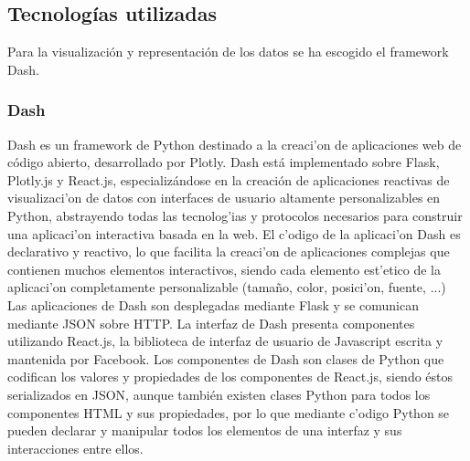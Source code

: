 \subsection{Tecnologías utilizadas}
Para la visualización y representación de los datos se ha escogido el framework Dash.

\subsubsection{Dash}
Dash es un framework de Python destinado a la creaci'on de aplicaciones web de código abierto, desarrollado por Plotly.
Dash está implementado sobre Flask, Plotly.js y React.js, especializándose  en la creación de aplicaciones reactivas de visualizaci'on de datos con interfaces de usuario altamente personalizables en Python, abstrayendo todas las tecnolog'ias y protocolos necesarios para construir una aplicaci'on interactiva basada en la web.
El c'odigo de la aplicaci'on Dash es declarativo y reactivo, lo que facilita la creaci'on de aplicaciones complejas que contienen muchos elementos interactivos, siendo cada elemento est'etico de la aplicaci'on completamente personalizable (tamaño, color, posici'on, fuente, ...)
Las aplicaciones de Dash son desplegadas mediante Flask y se comunican mediante JSON sobre HTTP. 
La interfaz de Dash presenta componentes utilizando React.js, la biblioteca de interfaz de usuario de Javascript escrita y mantenida por Facebook.
Los componentes de Dash son clases de Python que codifican los valores y propiedades de los componentes de React.js, siendo éstos serializados en JSON, aunque también existen clases Python para todos los componentes HTML y sus propiedades, por lo que mediante c'odigo Python se pueden declarar y manipular todos los elementos de una interfaz y sus interacciones entre ellos.




